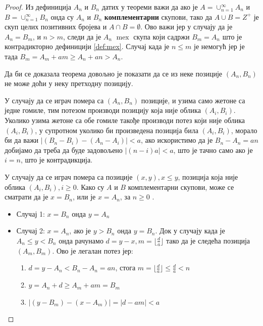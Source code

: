 \documentclass[a4paper]{article}
\DeclareMathOperator{\mex}{mex}
\begin{document}
\begin{proof}
	
	Из дефиниција $ A_{n} $ и $ B_{n} $ датих у теореми важи да ако је $ A = \cup_{n=1}^{\infty} A_{n} $ и  $ B = \cup_{n=1}^{\infty} B_{n} $ онда су $ A_{n} $ и $ B_{n} $ \textbf{комплементарни} скупови, тако да $ A \cup B = Z^{+} $ је скуп целих позитивних бројева  и $ A \cap B = \emptyset $. Ово важи јер у случају да је $ A_{n} = B_{m} $, и $ n > m $, следи да је $ A_{n} $ $ \mex $ скупа који садржи $ B_{m} = A_{n} $ што је контрадикторно дефиницији \ref{def:mex}. Случај када је $ n \leq m $ је немогућ јер је тада $ B_{m} = A_{m} + am \geq  A_{n} + an > A_{n} $.
	
	Да би се доказала теорема довољно је показати да се из неке позиције $ (A_{n}, B_{n}) $ не може доћи у неку претходну позицију.
	
	У случају да се играч помера са $ (A_{n}, B_{n}) $ позиције, и узима само жетоне са једне гомиле, тим потезом производи позицију која није облика $ (A_{i}, B_{i}) $. Уколико узима жетоне са обе гомиле такође производи потез који није облика $ (A_{i}, B_{i}) $, у супротном уколико би произведена позиција била $ (A_{i}, B_{i}) $, морало би да важи $ |(B_{n} - B_{i}) - (A_{n}-A_{i})| < a $, ако искористимо да је $ B_{n} - A_{n} = an $ добијамо да треба да буде задовољено $ |(n-i)a| < a $, што је тачно само ако је $ i = n $, што је контрадикција. 
	
	У случају да се играч помера са позиције $ (x, y), x \le y $, позиција која није облика $ (A_{i}, B_{i}), i \ge 0 $. Како су $ A $ и $ B $ комплементарни скупови, може се сматрати да је $ x = B_{n} $, или је $ x = A_{n} $, за $ n \ge 0 $ .
	\begin{itemize}
		\item \label{case:slucaj1} Случај 1: $ x = B_{n} $ онда $ y = A_{n} $ 
		\item \label{case:slucaj2} Случај 2: $ x = A_{n} $, ако је $ y > B_{n} $ онда $ y = B_{n} $. Док у случају када је $ A_{n} \le y < B_{n} $ онда рачунамо $ d = y - x, m = \lfloor \frac{d}{a} \rfloor $ тако да је следећа позиција $ (A_{m}, B_{m}) $. Ово је легалан потез јер:
		\begin{enumerate}
			\item $ d = y - A_{n} < B_{n} - A_{n} = an $, стога $ m = \lfloor \frac{d}{a} \rfloor \le \frac{d}{a} < n $
			\item $ y = A_{n} + d \ge A_{m} + am = B_m $
			\item $ |(y - B_{m}) - (x - A_{m})| = |d - am| < a $
		\end{enumerate}
	\end{itemize}
	
\end{proof}
\end{document}
